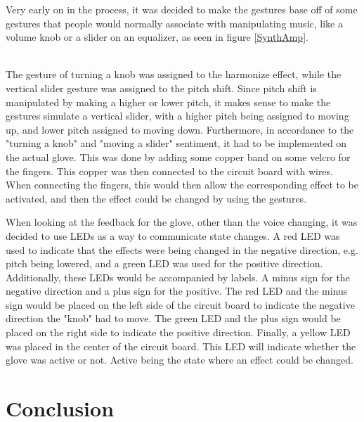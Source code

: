 Very early on in the process, it was decided to make the gestures base off of some gestures that people would normally associate with manipulating music, like a volume knob or a slider on an equalizer, as seen in figure \ref{SynthAmp}.\\

\begin{minipage}{\linewidth}%
\label{SynthAmp}
\end{minipage}\\

The gesture of turning a knob was assigned to the harmonize effect, while the vertical slider gesture was assigned to the pitch shift. Since pitch shift is manipulated by making a higher or lower pitch, it makes sense to make the gestures simulate a vertical slider, with a higher pitch being assigned to moving up, and lower pitch assigned to moving down.
Furthermore, in accordance to the "turning a knob" and "moving a slider" sentiment, it had to be implemented on the actual glove. This was done by adding some copper band on some velcro for the fingers. This copper was then connected to the circuit board with wires. When connecting the fingers, this would then allow the corresponding effect to be activated, and then the effect could be changed by using the gestures.

When looking at the feedback for the glove, other than the voice changing, it was decided to use LEDs as a way to communicate state changes. A red LED was used to indicate that the effects were being changed in the negative direction, e.g. pitch being lowered, and a green LED was used for the positive direction. Additionally, these LEDs would be accompanied by labels. A minus sign for the negative direction and a plus sign for the positive. The red LED and the minus sign would be placed on the left side of the circuit board to indicate the negative direction the "knob" had to move. The green LED and the plus sign would be placed on the right side to indicate the positive direction.
Finally, a yellow LED was placed in the center of the circuit board. This LED will indicate whether the glove was active or not. Active being the state where an effect could be changed.


\section{Conclusion}

